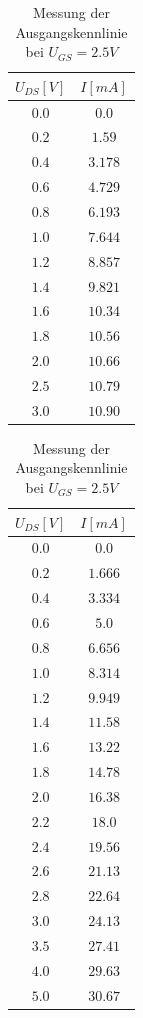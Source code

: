 \documentclass[11pt, a4paper]{article}
\begin{document}
\begin{table}[htb]
    \centering
    \begin{minipage}[b][][b]{0.45\linewidth}
        \centering
		\begin{tabular}{c|c}
		$U_{DS} [V]$ & $I [mA]$ \\ \hline
		$0.0$ & $0.0$ \\
		$0.2$ & $1.59$ \\
		$0.4$ & $3.178$ \\
		$0.6$ & $4.729$ \\
		$0.8$ & $6.193$ \\
		$1.0$ & $7.644$ \\
		$1.2$ & $8.857$ \\
		$1.4$ & $9.821$ \\
		$1.6$ & $10.34$ \\
		$1.8$ & $10.56$ \\
		$2.0$ & $10.66$ \\
		$2.5$ & $10.79$ \\
		$3.0$ & $10.90$ 
		\end{tabular}
		\caption{Messung der Ausgangskennlinie bei $U_{GS} = 3 V$}
		\label{ausgang3V}
    \end{minipage}%
    \hfill
    \begin{minipage}[b]{0.45\linewidth}
        \centering
		\begin{tabular}{c|c}
		$U_{DS} [V]$ & $I [mA]$ \\ \hline
		$0.0$ & $0.0$ \\
		$0.2$ & $1.666$ \\
		$0.4$ & $3.334$ \\
		$0.6$ & $5.0$ \\
		$0.8$ & $6.656$ \\
		$1.0$ & $8.314$ \\
		$1.2$ & $9.949$ \\
		$1.4$ & $11.58$ \\
		$1.6$ & $13.22$ \\
		$1.8$ & $14.78$ \\
		$2.0$ & $16.38$ \\
		$2.2$ & $18.0$ \\
		$2.4$ & $19.56$ \\
		$2.6$ & $21.13$ \\
		$2.8$ & $22.64$ \\
		$3.0$ & $24.13$ \\
		$3.5$ & $27.41$ \\
		$4.0$ & $29.63$ \\
		$5.0$ & $30.67$
		\end{tabular}
		\caption{Messung der Ausgangskennlinie bei $U_{GS} = 2.5 V$}
		\label{ausgang2-5V}
    \end{minipage}
\end{table}
\end{document}
